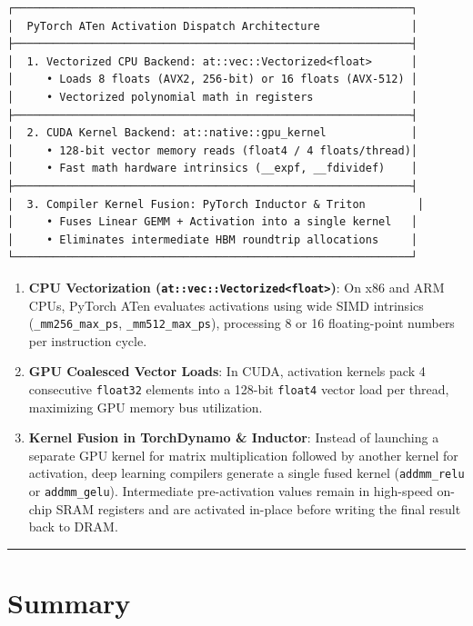 \documentclass[
  letterpaper,
]{scrbook}
\providecommand{\tightlist}{%
  \setlength{\itemsep}{0pt}\setlength{\parskip}{0pt}}
\begin{document}
\begin{verbatim}
┌─────────────────────────────────────────────────────────────┐
│  PyTorch ATen Activation Dispatch Architecture              │
├─────────────────────────────────────────────────────────────┤
│  1. Vectorized CPU Backend: at::vec::Vectorized<float>      │
│     • Loads 8 floats (AVX2, 256-bit) or 16 floats (AVX-512) │
│     • Vectorized polynomial math in registers               │
├─────────────────────────────────────────────────────────────┤
│  2. CUDA Kernel Backend: at::native::gpu_kernel             │
│     • 128-bit vector memory reads (float4 / 4 floats/thread)│
│     • Fast math hardware intrinsics (__expf, __fdividef)    │
├─────────────────────────────────────────────────────────────┤
│  3. Compiler Kernel Fusion: PyTorch Inductor & Triton        │
│     • Fuses Linear GEMM + Activation into a single kernel   │
│     • Eliminates intermediate HBM roundtrip allocations     │
└─────────────────────────────────────────────────────────────┘
\end{verbatim}

\begin{enumerate}
\def\labelenumi{\arabic{enumi}.}
\tightlist
\item
  \textbf{CPU Vectorization
  (\texttt{at::vec::Vectorized\textless{}float\textgreater{}})}: On x86
  and ARM CPUs, PyTorch ATen evaluates activations using wide SIMD
  intrinsics (\texttt{\_mm256\_max\_ps}, \texttt{\_mm512\_max\_ps}),
  processing 8 or 16 floating-point numbers per instruction cycle.
\item
  \textbf{GPU Coalesced Vector Loads}: In CUDA, activation kernels pack
  4 consecutive \texttt{float32} elements into a 128-bit \texttt{float4}
  vector load per thread, maximizing GPU memory bus utilization.
\item
  \textbf{Kernel Fusion in TorchDynamo \& Inductor}: Instead of
  launching a separate GPU kernel for matrix multiplication followed by
  another kernel for activation, deep learning compilers generate a
  single fused kernel (\texttt{addmm\_relu} or \texttt{addmm\_gelu}).
  Intermediate pre-activation values remain in high-speed on-chip SRAM
  registers and are activated in-place before writing the final result
  back to DRAM.
\end{enumerate}

\begin{center}\rule{0.5\linewidth}{0.5pt}\end{center}

\section{Summary}\label{summary-2}
\end{document}
